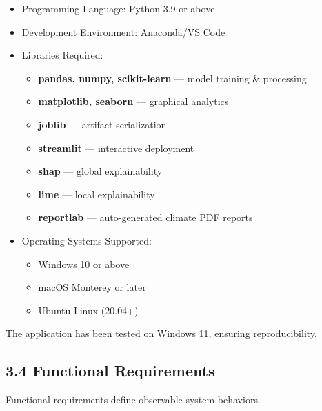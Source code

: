 \documentclass[12pt, a4paper]{article}
\begin{document}
\begin{itemize}
\item Programming Language: Python 3.9 or above  
\item Development Environment: Anaconda/VS Code
\item Libraries Required:
\begin{itemize}
    \item \textbf{pandas, numpy, scikit-learn} — model training & processing
    \item \textbf{matplotlib, seaborn} — graphical analytics
    \item \textbf{joblib} — artifact serialization
    \item \textbf{streamlit} — interactive deployment
    \item \textbf{shap} — global explainability
    \item \textbf{lime} — local explainability
    \item \textbf{reportlab} — auto-generated climate PDF reports
\end{itemize}
\item Operating Systems Supported:
\begin{itemize}
    \item Windows 10 or above
    \item macOS Monterey or later
    \item Ubuntu Linux (20.04+)
\end{itemize}
\end{itemize}

\noindent
The application has been tested on Windows 11, ensuring reproducibility.

\subsection{\textbf{3.4 Functional Requirements}}

Functional requirements define observable system behaviors.
\end{document}
